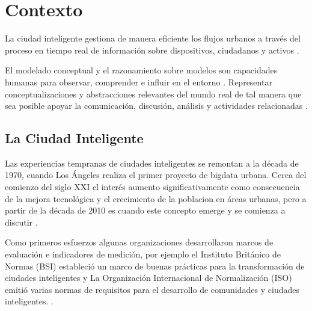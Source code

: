 \documentclass[a4paper,fleqn,spanish]{cas-dc}
\begin{document}
\section{Contexto}\label{marco}



La ciudad inteligente
gestiona de manera eficiente los flujos urbanos
a través del proceso en tiempo real de información
sobre dispositivos, ciudadanos y activos
\cite{stubinger_understanding_2020}
. 

El modelado conceptual y el razonamiento sobre modelos
son capacidades humanas
para observar, comprender e influir en el entorno
\cite{Mawr2020}.
Representar conceptualizaciones y abstracciones
relevantes del mundo real
de tal manera que sea posible apoyar la comunicación, discusión, análisis y actividades relacionadas
\cite{Delcambre2019}
. 




\subsection{La Ciudad Inteligente}\label{concepto}

Las experiencias tempranas de ciudades inteligentes se remontan a la década
de 1970, cuando Los Ángeles realiza el primer proyecto de bigdata urbana.
Cerca del comienzo del siglo XXI
el interés aumento significativamente como consecuencia de la mejora
tecnológica y el crecimiento de la poblacion en áreas urbanas,
pero a partir de la década de 2010 es cuando este concepto emerge y se comienza a discutir
\cite{stubinger_understanding_2020}.

Como primeros esfuerzos 
algunas organizaciones 
desarrollaron marcos de evaluación e indicadores de medición,
por ejemplo
el Instituto Británico de Normas
(BSI) estableció
un marco de buenas prácticas para la
transformación de ciudades inteligentes
y
La Organización Internacional de Normalización (ISO) emitió
varias normas de requisitos para el desarrollo de comunidades y
ciudades inteligentes.
\cite{aljowder_systematic_2019}.
\end{document}
